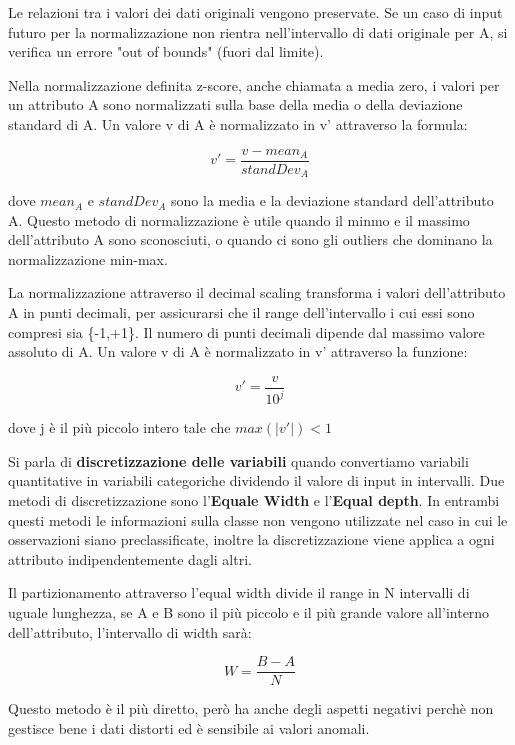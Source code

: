 \documentclass[a4paper]{extarticle}
\begin{document}
Le relazioni tra i valori dei dati originali vengono preservate. Se un caso di input futuro per la normalizzazione non rientra nell'intervallo di dati originale per A, si verifica un errore "out of bounds" (fuori dal limite).

Nella normalizzazione definita z-score, anche chiamata a media zero, i valori per un attributo A sono normalizzati sulla base della media o della deviazione standard di A. Un valore v di A è normalizzato in v' attraverso la formula:

\begin{equation}
v'=\dfrac{v-mean_A}{standDev_A}
\end{equation}

dove $mean_A$ e $standDev_A$ sono la media e la deviazione standard dell'attributo A. Questo metodo di normalizzazione è utile quando il minmo e il massimo dell'attributo A sono sconosciuti, o quando ci sono gli outliers che dominano la normalizzazione min-max.

La normalizzazione attraverso il decimal scaling transforma i valori dell'attributo A in punti decimali, per assicurarsi che il range dell'intervallo i cui essi sono compresi sia \{-1,+1\}. Il numero di punti decimali dipende dal massimo valore assoluto di A. Un valore v di A è normalizzato in v' attraverso la funzione:

\begin{equation}
v'= \dfrac{v}{10^j}
\end{equation}

dove j è il più piccolo intero tale che $max(|v'|)<1$

Si parla di \textbf{discretizzazione delle variabili} quando convertiamo variabili quantitative in variabili categoriche dividendo il valore di input in intervalli. Due metodi di discretizzazione sono l'\textbf{Equale Width} e l'\textbf{Equal depth}. In entrambi questi metodi le informazioni sulla classe non vengono utilizzate nel caso in cui le osservazioni siano preclassificate, inoltre la discretizzazione viene applica a ogni attributo indipendentemente dagli altri. 

Il partizionamento attraverso l'equal width divide il range in N intervalli di uguale lunghezza, se A e B sono il più piccolo e il più grande valore all'interno dell'attributo, l'intervallo di width sarà:

\begin{equation}
W=\dfrac{B-A}{N}
\end{equation}

Questo metodo è il più diretto, però ha anche degli aspetti negativi perchè non gestisce bene i dati distorti ed è sensibile ai valori anomali.
\end{document}
